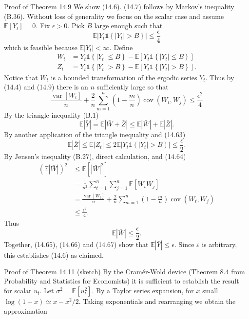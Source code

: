 \documentclass[10pt]{article}
\begin{document}
Proof of Theorem 14.9 We show (14.6). (14.7) follows by Markov's inequality (B.36). Without loss of generality we focus on the scalar case and assume $\mathbb{E}\left[Y_{t}\right]=0$. Fix $\epsilon>0$. Pick $B$ large enough such that
$$
\mathbb{E}\left|Y_{t} \mathbb{1}\left\{\left|Y_{t}\right|>B\right\}\right| \leq \frac{\epsilon}{4}
$$
which is feasible because $\mathbb{E}\left|Y_{t}\right|<\infty$. Define
$$
\begin{aligned}
W_{t} &=Y_{t} \mathbb{1}\left\{\left|Y_{t}\right| \leq B\right\}-\mathbb{E}\left[Y_{t} \mathbb{1}\left\{\left|Y_{t}\right| \leq B\right\}\right] \\
Z_{t} &=Y_{t} \mathbb{1}\left\{\left|Y_{t}\right|>B\right\}-\mathbb{E}\left[Y_{t} \mathbb{1}\left\{\left|Y_{t}\right|>B\right\}\right] .
\end{aligned}
$$
Notice that $W_{t}$ is a bounded transformation of the ergodic series $Y_{t}$. Thus by (14.4) and (14.9) there is an $n$ sufficiently large so that
$$
\frac{\operatorname{var}\left[W_{t}\right]}{n}+\frac{2}{n} \sum_{m=1}^{n}\left(1-\frac{m}{n}\right) \operatorname{cov}\left(W_{t}, W_{j}\right) \leq \frac{\epsilon^{2}}{4}
$$
By the triangle inequality (B.1)
$$
\mathbb{E}|\bar{Y}|=\mathbb{E}|\bar{W}+\bar{Z}| \leq \mathbb{E}|\bar{W}|+\mathbb{E}|\bar{Z}| .
$$
By another application of the triangle inequality and (14.63)
$$
\mathbb{E}|\bar{Z}| \leq \mathbb{E}\left|Z_{t}\right| \leq 2 \mathbb{E}\left|Y_{t} \mathbb{1}\left(\left|Y_{t}\right|>B\right)\right| \leq \frac{\epsilon}{2} .
$$
By Jensen's inequality (B.27), direct calculation, and (14.64)
$$
\begin{aligned}
(\mathbb{E}|\bar{W}|)^{2} & \leq \mathbb{E}\left[|\bar{W}|^{2}\right] \\
&=\frac{1}{n^{2}} \sum_{t=1}^{n} \sum_{j=1}^{n} \mathbb{E}\left[W_{t} W_{j}\right] \\
&=\frac{\operatorname{var}\left[W_{t}\right]}{n}+\frac{2}{n} \sum_{m=1}^{n}\left(1-\frac{m}{n}\right) \operatorname{cov}\left(W_{t}, W_{j}\right) \\
& \leq \frac{\epsilon^{2}}{4} .
\end{aligned}
$$
Thus
$$
\mathbb{E}|\bar{W}| \leq \frac{\epsilon}{2} .
$$
Together, (14.65), (14.66) and (14.67) show that $\mathbb{E}|\bar{Y}| \leq \epsilon$. Since $\varepsilon$ is arbitrary, this establishes (14.6) as claimed.

Proof of Theorem 14.11 (sketch) By the Cramér-Wold device (Theorem $8.4$ from Probability and Statistics for Economists) it is sufficient to establish the result for scalar $u_{t}$. Let $\sigma^{2}=\mathbb{E}\left[u_{t}^{2}\right]$. By a Taylor series expansion, for $x$ small $\log (1+x) \simeq x-x^{2} / 2$. Taking exponentials and rearranging we obtain the approximation
\end{document}
